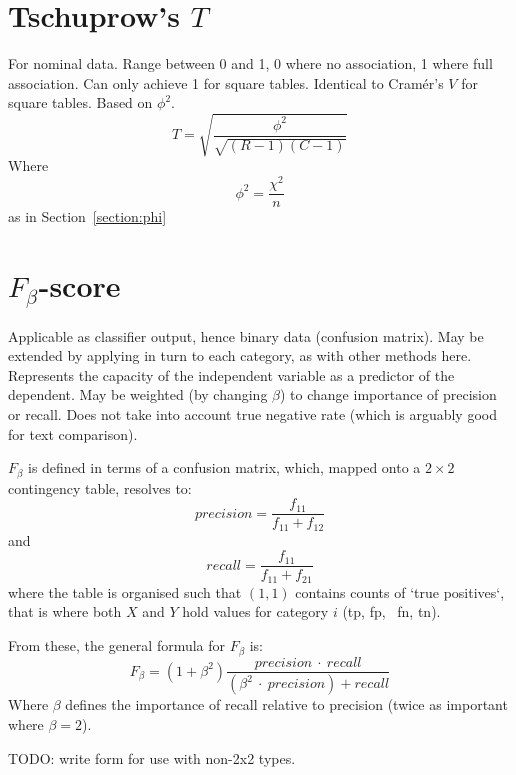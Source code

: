 \documentclass[11pt]{article}
\begin{document}
\section{Tschuprow's $T$}
For nominal data.  Range between 0 and 1, 0 where no association, 1 where full association.  Can only achieve 1 for square tables. Identical to Cram\'er's $V$ for square tables.  Based on $\phi^2$.
$$
T = \sqrt{ \frac{ \phi^2 }{ \sqrt{ (R-1)(C-1) } } }
$$
Where 
$$
\phi^2 = \frac{\chi^2}{n}
$$
as in Section~\ref{section:phi}

















\section{$F_\beta$-score}
Applicable as classifier output, hence binary data (confusion matrix).  May be extended by applying in turn to each category, as with other methods here.  Represents the capacity of the independent variable as a predictor of the dependent.  May be weighted (by changing $\beta$) to change importance of precision or recall.  Does not take into account true negative rate (which is arguably good for text comparison).

$F_\beta$ is defined in terms of a confusion matrix, which, mapped onto a $2\times 2$ contingency table, resolves to:
$$
precision = \frac{ f_{11} }{ f_{11} + f_{12} }
$$
and
$$
recall = \frac{ f_{11} }{ f_{11} + f_{21} }
$$
where the table is organised such that $(1,1)$ contains counts of `true positives`, that is where both $X$ and $Y$ hold values for category $i$ (tp, fp, \ fn, tn).

From these, the general formula for $F_\beta$ is:
$$
F_\beta = (1 + \beta^2) \frac{ precision ~\cdot~ recall }{ (\beta^2 ~ \cdot ~ precision) + recall }
$$
Where $\beta$ defines the importance of recall relative to precision (twice as important where $\beta = 2$).

TODO: write form for use with non-2x2 types.
\end{document}

